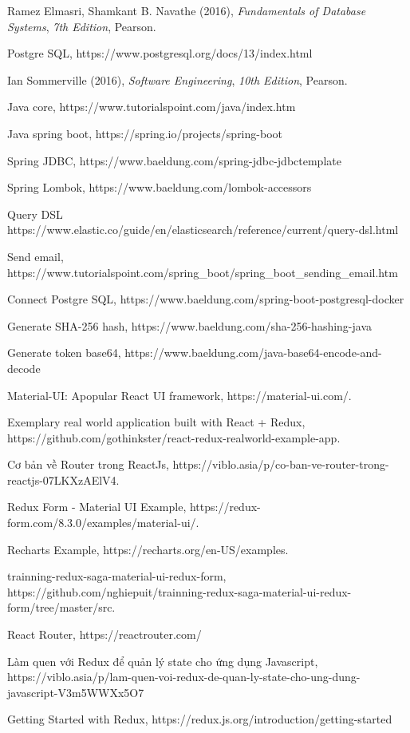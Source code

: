 \documentclass[a4paper]{article}
\begin{document}
	
\newpage
{}
\begin{thebibliography}{80}

 Ramez Elmasri, Shamkant B. Navathe (2016), \textit{Fundamentals of Database Systems}, \textit{7th Edition}, Pearson.

 Postgre SQL, https://www.postgresql.org/docs/13/index.html

 Ian Sommerville (2016), \textit{Software Engineering}, \textit{10th Edition}, Pearson.

 Java core, https://www.tutorialspoint.com/java/index.htm

 Java spring boot, https://spring.io/projects/spring-boot

 Spring JDBC, https://www.baeldung.com/spring-jdbc-jdbctemplate

 Spring Lombok, https://www.baeldung.com/lombok-accessors

 Query DSL https://www.elastic.co/guide/en/elasticsearch/reference/current/query-dsl.html

 Send email, https://www.tutorialspoint.com/spring\_boot/spring\_boot\_sending\_email.htm

 Connect Postgre SQL, https://www.baeldung.com/spring-boot-postgresql-docker

 Generate SHA-256 hash, https://www.baeldung.com/sha-256-hashing-java

 Generate token base64, https://www.baeldung.com/java-base64-encode-and-decode

\bibitem{} Material-UI: Apopular React UI framework, https://material-ui.com/. 

\bibitem{} Exemplary real world application built with React + Redux, https://github.com/gothinkster/react-redux-realworld-example-app. 

\bibitem{} Cơ bản về Router trong ReactJs, https://viblo.asia/p/co-ban-ve-router-trong-reactjs-07LKXzAElV4. 

\bibitem{} Redux Form - Material UI Example, https://redux-form.com/8.3.0/examples/material-ui/.

\bibitem{} Recharts Example, https://recharts.org/en-US/examples.

\bibitem{} trainning-redux-saga-material-ui-redux-form, https://github.com/nghiepuit/trainning-redux-saga-material-ui-redux-form/tree/master/src.

\bibitem{} React Router, https://reactrouter.com/

\bibitem{} Làm quen với Redux để quản lý state cho ứng dụng Javascript, https://viblo.asia/p/lam-quen-voi-redux-de-quan-ly-state-cho-ung-dung-javascript-V3m5WWXx5O7

\bibitem{} Getting Started with Redux, https://redux.js.org/introduction/getting-started



\end{thebibliography}
\end{document}
